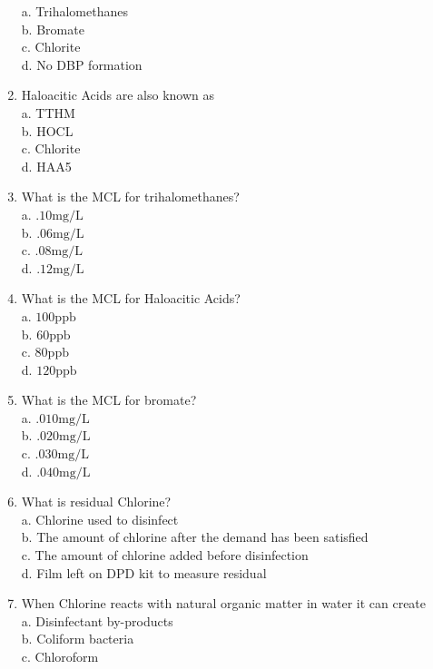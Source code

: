 \begin{enumerate}[1.]
a. Trihalomethanes\\
b. Bromate\\
c. Chlorite\\
d. No DBP formation\\
\item Haloacitic Acids are also known as\\
a. TTHM\\
b. HOCL\\
c. Chlorite\\
d. HAA5\\
\item What is the MCL for trihalomethanes?\\
a. $.10 \mathrm{mg} / \mathrm{L}$\\
b. $.06 \mathrm{mg} / \mathrm{L}$\\
c. $.08 \mathrm{mg} / \mathrm{L}$\\
d. $.12 \mathrm{mg} / \mathrm{L}$\\
\item What is the MCL for Haloacitic Acids?\\
a. $100 \mathrm{ppb}$\\
b. $60 \mathrm{ppb}$\\
c. $80 \mathrm{ppb}$\\
d. $120 \mathrm{ppb}$\\
\item What is the MCL for bromate?\\
a. $.010 \mathrm{mg} / \mathrm{L}$\\
b. $.020 \mathrm{mg} / \mathrm{L}$\\
c. $.030 \mathrm{mg} / \mathrm{L}$\\
d. $.040 \mathrm{mg} / \mathrm{L}$\\
\item What is residual Chlorine?\\
a. Chlorine used to disinfect\\
b. The amount of chlorine after the demand has been satisfied\\
c. The amount of chlorine added before disinfection\\
d. Film left on DPD kit to measure residual\\
\item When Chlorine reacts with natural organic matter in water it can create\\
a. Disinfectant by-products\\
b. Coliform bacteria\\
c. Chloroform\\

\end{enumerate}
